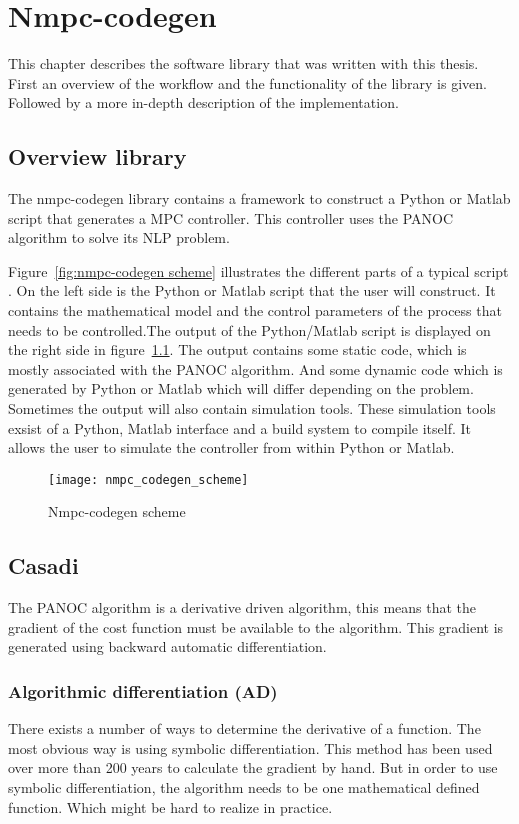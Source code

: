 \chapter{Nmpc-codegen}
This chapter describes the software library that was written with this thesis. First an overview of the workflow and the functionality of the library is given. Followed by a more in-depth description of the implementation.
\section{Overview library}
The nmpc-codegen library contains a framework to construct a Python or Matlab script that generates a MPC controller. This controller uses the PANOC algorithm to solve its NLP problem.

Figure~\eqref{fig:nmpc-codegen scheme} illustrates the different parts of a typical script . On the left side is the Python or Matlab script that the user will construct. It contains the mathematical model and the control parameters of the process that needs to be controlled.The output of the Python/Matlab script is displayed on the right side in figure~\ref{fig:nmpc-codegen scheme}. The output contains some static code, which is mostly associated with the PANOC algorithm. And some dynamic code which is generated by Python or Matlab which will differ depending on the problem. Sometimes the output will also contain simulation tools. These simulation tools exsist of a Python, Matlab interface and a build system to compile itself. It allows the user to simulate the controller from within Python or Matlab.
	\begin{figure}[H]
		\centering
		\texttt{[image: nmpc\_codegen\_scheme]}
		\caption{Nmpc-codegen scheme}
		\label{fig:nmpc-codegen scheme}
	\end{figure}

\section{Casadi}
The PANOC algorithm is a derivative driven algorithm, this means that the gradient of the cost function must be available to the algorithm. This gradient is generated using backward automatic differentiation.

\subsection{Algorithmic differentiation (AD)}
There exists a number of ways to determine the derivative of a function. The most obvious way is using symbolic differentiation. This method has been used over more than 200 years to calculate the gradient by hand. But in order to use symbolic differentiation, the algorithm needs to be one mathematical defined function. Which might be hard to realize in practice.

